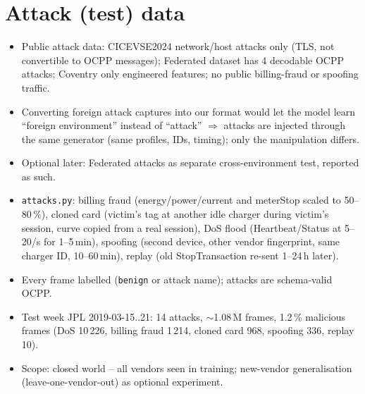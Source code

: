 \documentclass[11pt]{article}
\begin{document}
\section{Attack (test) data}
\begin{itemize}
  \item Public attack data: CICEVSE2024 network/host attacks only (TLS, not convertible to OCPP messages); Federated dataset has 4 decodable OCPP attacks; Coventry only engineered features; no public billing-fraud or spoofing traffic.
  \item Converting foreign attack captures into our format would let the model learn ``foreign environment'' instead of ``attack'' $\Rightarrow$ attacks are injected through the same generator (same profiles, IDs, timing); only the manipulation differs.
  \item Optional later: Federated attacks as separate cross-environment test, reported as such.
  \item \texttt{attacks.py}: billing fraud (energy/power/current and meterStop scaled to 50--80\,\%), cloned card (victim's tag at another idle charger during victim's session, curve copied from a real session), DoS flood (Heartbeat/Status at 5--20/s for 1--5\,min), spoofing (second device, other vendor fingerprint, same charger ID, 10--60\,min), replay (old StopTransaction re-sent 1--24\,h later).
  \item Every frame labelled (\texttt{benign} or attack name); attacks are schema-valid OCPP.
  \item Test week JPL 2019-03-15..21: 14 attacks, $\sim$1.08\,M frames, 1.2\,\% malicious frames (DoS 10\,226, billing fraud 1\,214, cloned card 968, spoofing 336, replay 10).
  \item Scope: closed world -- all vendors seen in training; new-vendor generalisation (leave-one-vendor-out) as optional experiment.
\end{itemize}
\end{document}
